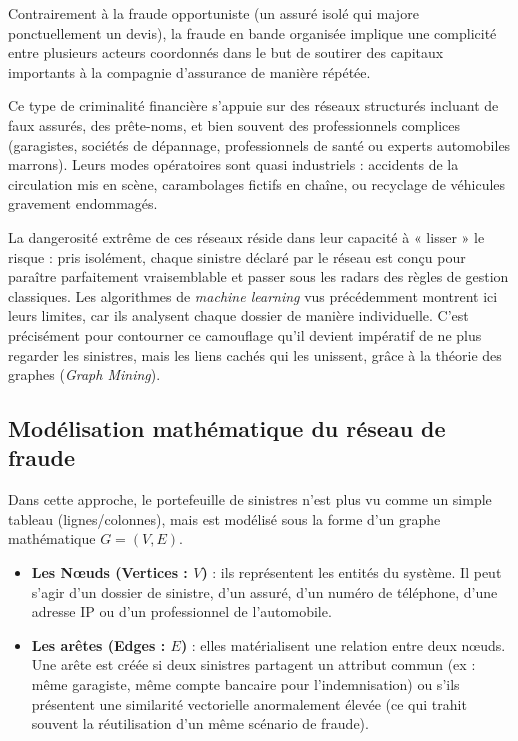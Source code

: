 Contrairement à la fraude opportuniste (un assuré isolé qui majore ponctuellement un devis), la fraude en bande organisée implique une complicité entre plusieurs acteurs coordonnés dans le but de soutirer des capitaux importants à la compagnie d'assurance de manière répétée.

Ce type de criminalité financière s'appuie sur des réseaux structurés incluant de faux assurés, des prête-noms, et bien souvent des professionnels complices (garagistes, sociétés de dépannage, professionnels de santé ou experts automobiles marrons). Leurs modes opératoires sont quasi industriels : accidents de la circulation mis en scène, carambolages fictifs en chaîne, ou recyclage de véhicules gravement endommagés.

La dangerosité extrême de ces réseaux réside dans leur capacité à « lisser » le risque : pris isolément, chaque sinistre déclaré par le réseau est conçu pour paraître parfaitement vraisemblable et passer sous les radars des règles de gestion classiques. Les algorithmes de \textit{machine learning} vus précédemment montrent ici leurs limites, car ils analysent chaque dossier de manière individuelle. C'est précisément pour contourner ce camouflage qu'il devient impératif de ne plus regarder les sinistres, mais les liens cachés qui les unissent, grâce à la théorie des graphes (\textit{Graph Mining}).

\subsection{Modélisation mathématique du réseau de fraude}

Dans cette approche, le portefeuille de sinistres n'est plus vu comme un simple tableau (lignes/colonnes), mais est modélisé sous la forme d'un graphe mathématique $G = (V, E)$.

\begin{itemize}
    \item[$\bullet$] \textbf{Les Nœuds (Vertices : $V$)} : ils représentent les entités du système. Il peut s'agir d'un dossier de sinistre, d'un assuré, d'un numéro de téléphone, d'une adresse IP ou d'un professionnel de l'automobile.
    \item[$\bullet$] \textbf{Les arêtes (Edges : $E$)} : elles matérialisent une relation entre deux nœuds. Une arête est créée si deux sinistres partagent un attribut commun (ex : même garagiste, même compte bancaire pour l'indemnisation) ou s'ils présentent une similarité vectorielle anormalement élevée (ce qui trahit souvent la réutilisation d'un même scénario de fraude).
\end{itemize}

